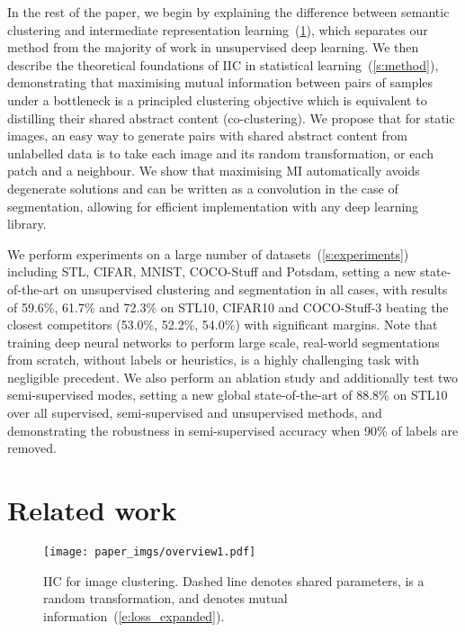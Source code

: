\documentclass[10pt,twocolumn,letterpaper]{article}
\newcommand{\methodnameshort}{IIC\xspace}
\begin{document}
In the rest of the paper, we begin by explaining the difference between semantic clustering and intermediate representation learning~(\cref{s:related}), which separates our method from the majority of work in unsupervised deep learning. 
We then describe the theoretical foundations of \methodnameshort in statistical learning~(\cref{s:method}), demonstrating that maximising mutual information between pairs of samples under a bottleneck is a principled clustering objective which is equivalent to distilling their shared abstract content (co-clustering).
We propose that for static images, an easy way to generate pairs with shared abstract content from unlabelled data is to take each image and its random transformation, or each patch and a neighbour.
We show that maximising MI automatically avoids degenerate solutions and can be written as a convolution in the case of segmentation, allowing for efficient implementation with any deep learning library.

We perform experiments on a large number of datasets~(\cref{s:experiments}) including STL, CIFAR, MNIST, COCO-Stuff and Potsdam, setting a new state-of-the-art on unsupervised clustering and segmentation in all cases, with results of 59.6\%, 61.7\% and 72.3\% on STL10, CIFAR10 and COCO-Stuff-3 beating the closest competitors (53.0\%, 52.2\%, 54.0\%) with significant margins.
Note that training deep neural networks to perform large scale, real-world segmentations from scratch, without labels or heuristics, is a highly challenging task with negligible precedent.
We also perform an ablation study and additionally test two semi-supervised modes, setting a new global state-of-the-art of 88.8\% on STL10 over all supervised, semi-supervised and unsupervised methods, and demonstrating the robustness in semi-supervised accuracy when 90\% of labels are removed.


 \section{Related work}\label{s:related}

\begin{figure}[t]
\centering
\texttt{[image: paper\_imgs/overview1.pdf]}
\caption{\label{f:overview}\methodnameshort for image clustering. Dashed line denotes shared parameters,  is a random transformation, and  denotes mutual information~(\cref{e:loss_expanded}).}
\end{figure}
 
\end{document}
